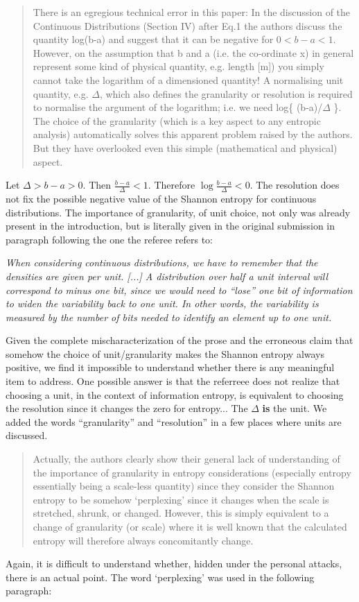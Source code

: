 \documentclass[11pt]{article}
\begin{document}
\begin{quote}
	There is an egregious technical error in this paper: In the discussion of the Continuous Distributions (Section IV) after Eq.1 the authors discuss the quantity log(b-a) and suggest that it can be negative for $0<b-a<1$. However, on the assumption that b and a (i.e. the co-ordinate x) in general represent some kind of physical quantity, e.g. length [m]) you simply cannot take the logarithm of a dimensioned quantity! A normalising unit quantity, e.g. $\Delta$, which also defines the granularity or resolution is required to normalise the argument of the logarithm; i.e. we need log\{ (b-a)/$\Delta$ \}. The choice of the granularity (which is a key aspect to any entropic analysis) automatically solves this apparent problem raised by the authors. But they have overlooked even this simple (mathematical and physical) aspect.
\end{quote}
Let $\Delta > b - a > 0$. Then $\frac{b-a}{\Delta} < 1$. Therefore $\log \frac{b-a}{\Delta} < 0$. The resolution does not fix the possible negative value of the Shannon entropy for continuous distributions. The importance of granularity, of unit choice, not only was already present in the introduction, but is literally given in the original submission in paragraph following the one the referee refers to:

\emph{	When considering continuous distributions, we have to remember that the densities are given per unit. [...] A distribution over half a unit interval will correspond to minus one bit, since we would need to ``lose'' one bit of information to widen the variability back to one unit. In other words, the variability is measured by the number of bits needed to identify an element up to one unit.}

Given the complete mischaracterization of the prose and the erroneous claim that somehow the choice of unit/granularity makes the Shannon entropy always positive, we find it impossible to understand whether there is any meaningful item to address. One possible answer is that the referreee does not realize that choosing a unit, in the context of information entropy, is equivalent to choosing the resolution since it changes the zero for entropy... The $\Delta$ \textbf{is} the unit. We added the words ``granularity'' and ``resolution'' in a few places where units are discussed. 

\begin{quote}
Actually, the authors clearly show their general lack of understanding of the importance of granularity in entropy considerations (especially entropy essentially being a scale-less quantity) since they consider the Shannon entropy to be somehow ‘perplexing’ since it changes when the scale is stretched, shrunk, or changed. However, this is simply equivalent to a change of granularity (or scale) where it is well known that the calculated entropy will therefore always concomitantly change. 
\end{quote}
Again, it is difficult to understand whether, hidden under the personal attacks, there is an actual point. The word `perplexing' was used in the following paragraph:
\end{document}
